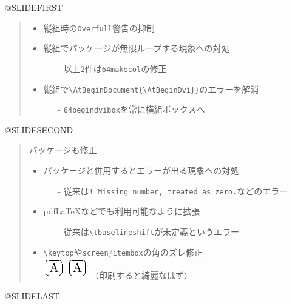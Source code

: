 \documentclass[a4paper,papersize,25pt,slide,dvipdfmx]{jsarticle}
\begin{document}
@SLIDEFIRST
\begin{quote}
\begin{itemize}
  \item 縦組時の\texttt{Overfull}警告の抑制
  \item 縦組でパッケージが無限ループする現象への対処
  \begin{itemize}
    \item[-] 以上2件は\texttt{\char64makecol}の修正
  \end{itemize}
  \item 縦組で\verb+\AtBeginDocument{\AtBeginDvi}}+のエラーを解消
  \begin{itemize}
    \item[-] \texttt{\char64begindvibox}を常に横組ボックスへ
  \end{itemize}
\end{itemize}
\end{quote}
@SLIDESECOND
\begin{quote}
パッケージも修正
\begin{itemize}
  \item {}パッケージと併用するとエラーが出る現象への対処
  \begin{itemize}
    \item[-] 従来は\verb+! Missing number, treated as zero.+などのエラー
  \end{itemize}
  \item pdf\LaTeX などでも利用可能なように拡張
  \begin{itemize}
    \item[-] 従来は\verb+\tbaselineshift+が未定義というエラー
  \end{itemize}
  \item \verb+\keytop+や\texttt{screen}/\texttt{itembox}の角のズレ修正\\
\includegraphics[scale=3]{demo/demo07-2013-crop.pdf} 
\includegraphics[scale=3]{demo/demo07-2016-crop.pdf}
（印刷すると綺麗なはず）
\end{itemize}
\end{quote}
@SLIDELAST
\SLIDEEND
\end{document}
